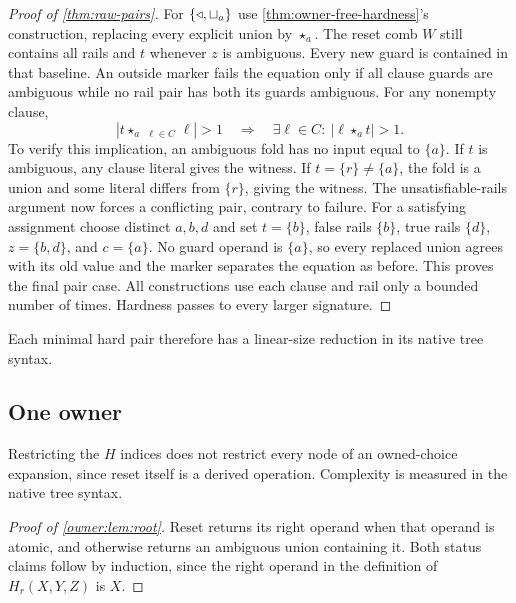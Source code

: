 \begin{proof}[Proof of \cref{thm:raw-pairs}]
For $\{\mathbin{\triangleleft},\sqcup_a\}$ use \cref{thm:owner-free-hardness}'s construction,
replacing every explicit union by $\star_a$. The reset comb $W$ still
contains all rails and $t$ whenever $z$ is ambiguous. Every new guard
is contained in that baseline. An outside marker fails the equation
only if all clause guards are ambiguous while no rail pair has both
its guards ambiguous. For any nonempty clause,
\[
 \left|t\star_a\mathop{\star_a}_{\ell\in C}\ell\right|>1
 \quad\Longrightarrow\quad
 \exists\ell\in C:\ |\ell\star_a t|>1.
\]
To verify this implication, an ambiguous fold has no input equal to
$\{a\}$. If $t$ is ambiguous, any clause literal gives the witness.
If $t=\{r\}\ne\{a\}$, the fold is a union and some literal differs
from $\{r\}$, giving the witness. The unsatisfiable-rails argument now
forces a conflicting pair, contrary to failure.
For a satisfying assignment choose distinct $a,b,d$ and set
$t=\{b\}$, false rails $\{b\}$, true rails $\{d\}$,
$z=\{b,d\}$, and $c=\{a\}$. No guard operand is $\{a\}$,
so every replaced union agrees with its old value and the marker
separates the equation as before. This proves the final pair case.
All constructions use each clause and rail only a bounded number of
times. Hardness passes to every larger signature.
\end{proof}

Each minimal hard pair therefore has a linear-size reduction in its native tree syntax.



\subsection{One owner}\label{app:proofs-owner}

Restricting the $H$ indices does not restrict every node of an owned-choice expansion, since reset itself is a derived operation. Complexity is measured in the native tree syntax.

\begin{proof}[Proof of \cref{owner:lem:root}]
Reset returns its right operand when that operand is atomic, and
otherwise returns an ambiguous union containing it. Both status claims
follow by induction, since the right operand in the definition of
$H_r(X,Y,Z)$ is $X$.
\end{proof}

